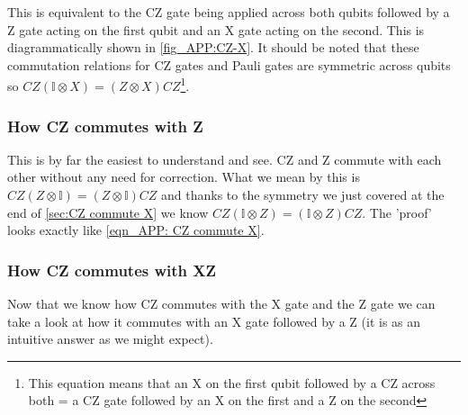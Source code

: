 This is equivalent to the CZ gate being applied across both qubits followed by a Z gate acting on the first qubit and an X gate acting on the second. This is diagrammatically shown in \ref{fig_APP:CZ-X}. It should be noted that these commutation relations for CZ gates and Pauli gates are symmetric across qubits so $CZ(\mathbb{I}\otimes X) = (Z\otimes X)CZ$\footnote{This equation means that an X on the first qubit followed by a CZ across both = a CZ gate followed by an X on the first and a Z on the second}.

\subsubsection{How CZ commutes with Z}
This is by far the easiest to understand and see. CZ and Z commute with each other without any need for correction. What we mean by this is $CZ(Z\otimes\mathbb{I}) = (Z\otimes\mathbb{I})CZ$ and thanks to the symmetry we just covered at the end of \ref{sec:CZ commute X} we know $CZ(\mathbb{I}\otimes Z) = (\mathbb{I}\otimes Z)CZ$. The 'proof' looks exactly like \ref{eqn_APP: CZ commute X}.

\subsubsection{How CZ commutes with XZ}
Now that we know how CZ commutes with the X gate and the Z gate we can take a look at how it commutes with an X gate followed by a Z (it is as an intuitive answer as we might expect).

